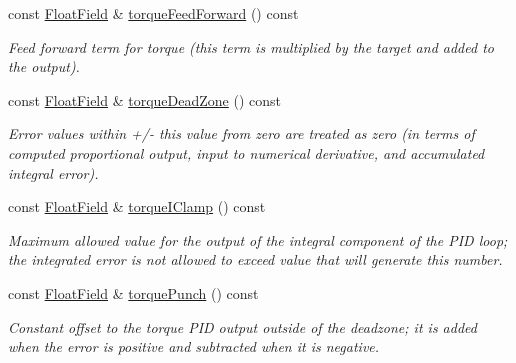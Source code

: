 \begin{DoxyCompactItemize}
const \hyperlink{classhebi_1_1Info_1_1FloatField}{Float\+Field} \& \hyperlink{classhebi_1_1Info_1_1Settings_1_1Actuator_1_1TorqueGains_a3706df87c94b3c251df3c8e0ae52a25b}{torque\+Feed\+Forward} () const
\begin{DoxyCompactList}\small\item\em Feed forward term for torque (this term is multiplied by the target and added to the output). \end{DoxyCompactList}\item 
\mbox{\label{classhebi_1_1Info_1_1Settings_1_1Actuator_1_1TorqueGains_ac759d8e8b784137ba6b64436a419921a}} 
const \hyperlink{classhebi_1_1Info_1_1FloatField}{Float\+Field} \& \hyperlink{classhebi_1_1Info_1_1Settings_1_1Actuator_1_1TorqueGains_ac759d8e8b784137ba6b64436a419921a}{torque\+Dead\+Zone} () const
\begin{DoxyCompactList}\small\item\em Error values within +/-\/ this value from zero are treated as zero (in terms of computed proportional output, input to numerical derivative, and accumulated integral error). \end{DoxyCompactList}\item 
\mbox{\label{classhebi_1_1Info_1_1Settings_1_1Actuator_1_1TorqueGains_ab4054b2f3e7f2135e799c2a620c4e44e}} 
const \hyperlink{classhebi_1_1Info_1_1FloatField}{Float\+Field} \& \hyperlink{classhebi_1_1Info_1_1Settings_1_1Actuator_1_1TorqueGains_ab4054b2f3e7f2135e799c2a620c4e44e}{torque\+I\+Clamp} () const
\begin{DoxyCompactList}\small\item\em Maximum allowed value for the output of the integral component of the P\+ID loop; the integrated error is not allowed to exceed value that will generate this number. \end{DoxyCompactList}\item 
\mbox{\label{classhebi_1_1Info_1_1Settings_1_1Actuator_1_1TorqueGains_a6a16083464d3b9bab14af8edd546f0c2}} 
const \hyperlink{classhebi_1_1Info_1_1FloatField}{Float\+Field} \& \hyperlink{classhebi_1_1Info_1_1Settings_1_1Actuator_1_1TorqueGains_a6a16083464d3b9bab14af8edd546f0c2}{torque\+Punch} () const
\begin{DoxyCompactList}\small\item\em Constant offset to the torque P\+ID output outside of the deadzone; it is added when the error is positive and subtracted when it is negative. \end{DoxyCompactList}\item 

\end{DoxyCompactItemize}
